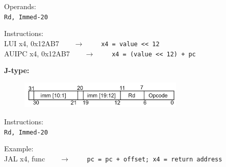 \begin{description}
\begin{figure}[h]
  \end{figure}
	\begin{description}
		\item Operands:\\
		\texttt{Rd, Immed-20}
		\item Instructions:\\
		\textsf{LUI x4, 0x12AB7}\ \ \ \ $\longrightarrow$ \ \ \ \ \texttt{x4 = value << 12}\\
		\textsf{AUIPC x4, 0x12AB7}\ \ \ \ $\longrightarrow$ \ \ \ \ \texttt{x4 = (value << 12) + pc}
	\end{description}
	\item \textbf{J-type:}
  \begin{figure}[h!]
    \center
    \includegraphics[width=0.7\textwidth]{sec1/images/Jtype.png}
  \end{figure}
	\begin{description}
		\item Instructions:\\
		\texttt{Rd, Immed-20}
		\item Example:\\
		\textsf{JAL x4, func}\ \ \ \ $\longrightarrow$ \ \ \ \ \texttt{pc = pc + offset; x4 = return address}
	\end{description}
\end{description}
